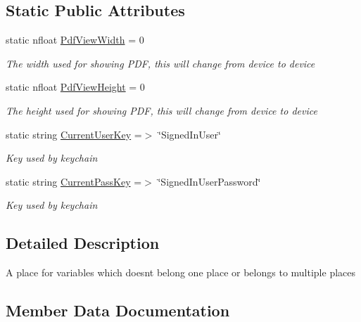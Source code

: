 \subsection*{Static Public Attributes}
\begin{DoxyCompactItemize}
\item 
static nfloat \hyperlink{class_ramboell_1_1i_o_s_1_1_global_aef9c2dceecf492a31f04ddfb138e73b8}{Pdf\+View\+Width} = 0
\begin{DoxyCompactList}\small\item\em The width used for showing P\+DF, this will change from device to device \end{DoxyCompactList}\item 
static nfloat \hyperlink{class_ramboell_1_1i_o_s_1_1_global_acb23d3ce312697f64e00118afbba0ef9}{Pdf\+View\+Height} = 0
\begin{DoxyCompactList}\small\item\em The height used for showing P\+DF, this will change from device to device \end{DoxyCompactList}\item 
static string \hyperlink{class_ramboell_1_1i_o_s_1_1_global_a26e13255685fbfd57d957b859ed6531a}{Current\+User\+Key} =$>$ \char`\"{}Signed\+In\+User\char`\"{}
\begin{DoxyCompactList}\small\item\em Key used by keychain \end{DoxyCompactList}\item 
static string \hyperlink{class_ramboell_1_1i_o_s_1_1_global_a325fa2a9350a8f11eec0db62211887c9}{Current\+Pass\+Key} =$>$ \char`\"{}Signed\+In\+User\+Password\char`\"{}
\begin{DoxyCompactList}\small\item\em Key used by keychain \end{DoxyCompactList}\end{DoxyCompactItemize}


\subsection{Detailed Description}
A place for variables which doesn\textquotesingle{}t belong one place or belongs to multiple places 



\subsection{Member Data Documentation}
\mbox{\label{class_ramboell_1_1i_o_s_1_1_global_a426db0fd3d089804ea567d6024b29167}} 
